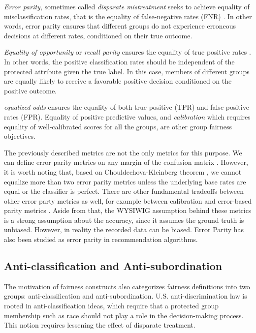         \textit{Error parity}, sometimes called \textit{disparate mistreatment} seeks to achieve equality of misclassification rates, that is the equality of false-negative rates (FNR) \cite{zafar2017fairness}. In other words, error parity ensures that different groups do not experience erroneous decisions at different rates, conditioned on their true outcome.
        
        \textit{Equality of opportunity} or \textit{recall parity} ensures the equality of true positive rates \cite{hardt2016equality}. In other words, the positive classification rates should be independent of the protected attribute given the true label. In this case, members of different groups are equally likely to receive a favorable positive decision conditioned on the positive outcome.
        
        \textit{equalized odds} \cite{hardt2016equality} ensures the equality of both true positive (TPR) and false positive rates (FPR). Equality of positive predictive values, and \textit{calibration} \cite{Kleinberg:InherentTrade} which requires equality of well-calibrated scores for all the groups, are other group fairness objectives.
        
        The previously described metrics are not the only metrics for this purpose. We can define error parity metrics on any margin of the confusion matrix \cite{mitchell2021algorithmic}. However, it is worth noting that, based on Chouldechova-Kleinberg theorem \cite{chouldechova2017fair,Kleinberg:InherentTrade}, we cannot equalize more than two error parity metrics unless the underlying base rates are equal or the classifier is perfect. There are other fundamental tradeoffs between other error party metrics as well, for example between calibration and error-based parity metrics \cite{pleiss2017fairness}. Aside from that, the WYSIWIG assumption behind these metrics is a strong assumption about the accuracy, since it assumes the ground truth is unbiased. However, in reality the recorded data can be biased. Error Parity has also been studied as error parity in recommendation algorithms\cite{ekstrand2018all,yao_huang_fatml-2017}.

    
    \subsection{Anti-classification and Anti-subordination}
        
        The motivation of fairness constructs also categorizes fairness definitions into two groups: anti-classification and anti-subordination. U.S. anti-discrimination law is rooted in anti-classification ideas, which require that a protected group membership such as race should not play a role in the decision-making process. This notion requires lessening the effect of disparate treatment.
        
